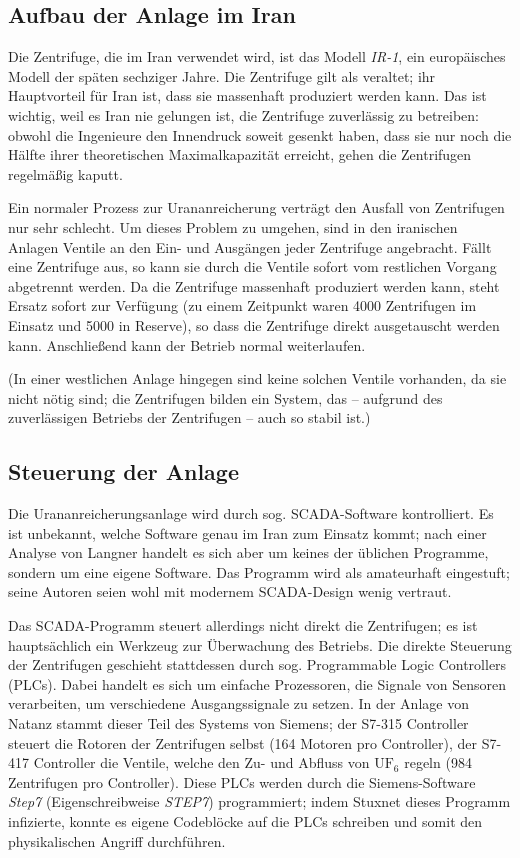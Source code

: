 \documentclass[a4paper]{article}
\begin{document}
\subsection{Aufbau der Anlage im Iran}

Die Zentrifuge, die im Iran verwendet wird, ist das Modell \emph{IR-1}, ein europäisches Modell der späten sechziger Jahre.
Die Zentrifuge gilt als veraltet; ihr Hauptvorteil für Iran ist, dass sie massenhaft produziert werden kann.
Das ist wichtig, weil es Iran nie gelungen ist, die Zentrifuge zuverlässig zu betreiben:
obwohl die Ingenieure den Innendruck soweit gesenkt haben, dass sie nur noch die Hälfte ihrer theoretischen Maximalkapazität erreicht,
gehen die Zentrifugen regelmäßig kaputt.

Ein normaler Prozess zur Urananreicherung verträgt den Ausfall von Zentrifugen nur sehr schlecht.
Um dieses Problem zu umgehen, sind in den iranischen Anlagen Ventile an den Ein- und Ausgängen jeder Zentrifuge angebracht.
Fällt eine Zentrifuge aus, so kann sie durch die Ventile sofort vom restlichen Vorgang abgetrennt werden.
Da die Zentrifuge massenhaft produziert werden kann, steht Ersatz sofort zur Verfügung
(zu einem Zeitpunkt waren 4000 Zentrifugen im Einsatz und 5000 in Reserve\cite{tkac}), %
so dass die Zentrifuge direkt ausgetauscht werden kann.
Anschließend kann der Betrieb normal weiterlaufen.

(In einer westlichen Anlage hingegen sind keine solchen Ventile vorhanden, da sie nicht nötig sind;
die Zentrifugen bilden ein System, das – aufgrund des zuverlässigen Betriebs der Zentrifugen – auch so stabil ist.)

\subsection{Steuerung der Anlage}

Die Urananreicherungsanlage wird durch sog. SCADA-Software kontrolliert.
Es ist unbekannt, welche Software genau im Iran zum Einsatz kommt;
nach einer Analyse von Langner\cite{tkac} handelt es sich aber um keines der üblichen Programme, %
sondern um eine eigene Software.
Das Programm wird als amateurhaft eingestuft;
seine Autoren seien wohl mit modernem SCADA-Design wenig vertraut. %

Das SCADA-Programm steuert allerdings nicht direkt die Zentrifugen;
es ist hauptsächlich ein Werkzeug zur Überwachung des Betriebs. %
Die direkte Steuerung der Zentrifugen geschieht stattdessen durch sog. Programmable Logic Controllers (PLCs).
Dabei handelt es sich um einfache Prozessoren, die Signale von Sensoren verarbeiten,
um verschiedene Ausgangssignale zu setzen.
In der Anlage von Natanz stammt dieser Teil des Systems von Siemens;
der S7-315 Controller steuert die Rotoren der Zentrifugen selbst (164 Motoren pro Controller), %
der S7-417 Controller die Ventile, welche den Zu- und Abfluss von $\mathrm{UF}_6$ regeln (984 Zentrifugen pro Controller).
Diese PLCs werden durch die Siemens-Software \emph{Step7} (Eigenschreibweise \emph{STEP7}) programmiert;
indem Stuxnet dieses Programm infizierte, konnte es eigene Codeblöcke auf die PLCs schreiben
und somit den physikalischen Angriff durchführen.
\end{document}
